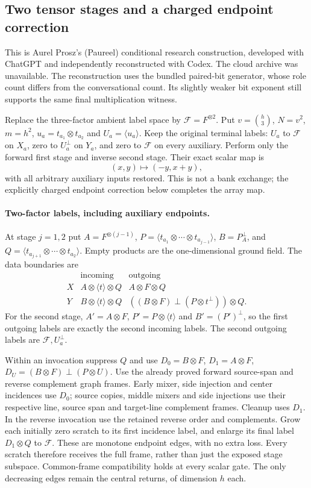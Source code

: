 \subsection{Two tensor stages and a charged endpoint correction}
\label{sec:two-stage}
This is Aurel Prosz's (Paureel) conditional research construction, developed
with ChatGPT and independently reconstructed with Codex. The cloud archive
was unavailable. The reconstruction uses the bundled paired-bit generator,
whose role count differs from the conversational count. Its slightly weaker
bit exponent still supports the same final multiplication witness.

Replace the three-factor ambient label space by $\mathcal F=F^{\otimes2}$.
Put $v=\binom h3$, $N=v^2$, $m=h^2$, $u_a=t_{a_1}\otimes t_{a_2}$ and
$U_a=\langle u_a\rangle$. Keep the original terminal labels: $U_a$ to
$\mathcal F$ on $X_a$, zero to $U_a^\perp$ on $Y_a$, and zero to
$\mathcal F$ on every auxiliary. Perform only the forward first stage
and inverse second stage. Their exact scalar map is
\[
 (x,y)\longmapsto(-y,x+y),
\]
with all arbitrary auxiliary inputs restored. This is not a bank exchange;
the explicitly charged endpoint correction below completes the array map.

\paragraph{Two-factor labels, including auxiliary endpoints.}
At stage $j=1,2$ put
$A=F^{\otimes(j-1)}$, $P=\langle t_{a_1}\otimes\cdots\otimes
t_{a_{j-1}}\rangle$, $B=P^\perp_A$, and
$Q=\langle t_{a_{j+1}}\otimes\cdots\otimes t_{a_2}\rangle$.
Empty products are the one-dimensional ground field. The data boundaries are
\[
\begin{array}{c|cc}
&\text{incoming}&\text{outgoing}\\\hline
X&A\otimes\langle t\rangle\otimes Q&A\otimes F\otimes Q\\
Y&B\otimes\langle t\rangle\otimes Q&
 ((B\otimes F)\perp(P\otimes t^\perp))\otimes Q.
\end{array}
\]
For the second stage, $A'=A\otimes F$, $P'=P\otimes\langle t\rangle$
and $B'=(P')^\perp$, so the first outgoing labels are exactly the second
incoming labels. The second outgoing labels are $\mathcal F,U_a^\perp$.

Within an invocation suppress $Q$ and use
$D_0=B\otimes F$, $D_1=A\otimes F$,
$D_U=(B\otimes F)\perp(P\otimes U)$.
Use the already proved forward source-span and reverse complement graph
frames. Early mixer, side injection and center incidences use $D_0$;
source copies, middle mixers and side injections use their respective
line, source span and target-line complement frames. Cleanup uses $D_1$.
In the reverse invocation use the retained reverse order and complements.
Grow each initially zero scratch to its first incidence label, and enlarge
its final label $D_1\otimes Q$ to $\mathcal F$. These are monotone endpoint
edges, with no extra loss. Every scratch therefore receives the full frame,
rather than just the exposed stage subspace. Common-frame compatibility
holds at every scalar gate. The only decreasing edges remain the central
returns, of dimension $h$ each.


